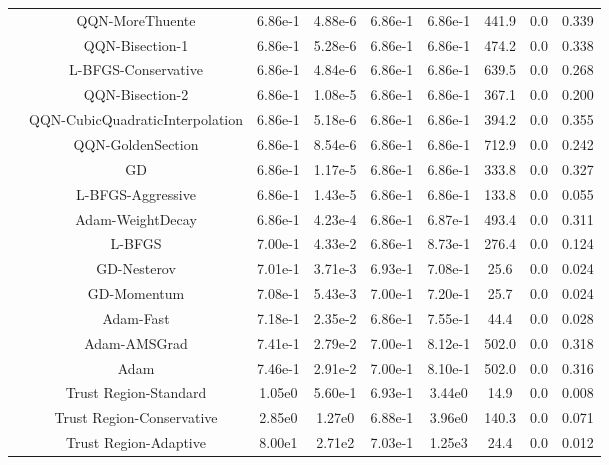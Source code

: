 \documentclass{article}
\begin{document}
{\begin{longtable}{l*{8}{S[table-format=2.2e-1]}}
 & QQN-MoreThuente & 6.86e-1 & 4.88e-6 & 6.86e-1 & 6.86e-1 & 441.9 & 0.0 & 0.339 \\
 & QQN-Bisection-1 & 6.86e-1 & 5.28e-6 & 6.86e-1 & 6.86e-1 & 474.2 & 0.0 & 0.338 \\
 & L-BFGS-Conservative & 6.86e-1 & 4.84e-6 & 6.86e-1 & 6.86e-1 & 639.5 & 0.0 & 0.268 \\
 & QQN-Bisection-2 & 6.86e-1 & 1.08e-5 & 6.86e-1 & 6.86e-1 & 367.1 & 0.0 & 0.200 \\
 & QQN-CubicQuadraticInterpolation & 6.86e-1 & 5.18e-6 & 6.86e-1 & 6.86e-1 & 394.2 & 0.0 & 0.355 \\
 & QQN-GoldenSection & 6.86e-1 & 8.54e-6 & 6.86e-1 & 6.86e-1 & 712.9 & 0.0 & 0.242 \\
 & GD & 6.86e-1 & 1.17e-5 & 6.86e-1 & 6.86e-1 & 333.8 & 0.0 & 0.327 \\
 & L-BFGS-Aggressive & 6.86e-1 & 1.43e-5 & 6.86e-1 & 6.86e-1 & 133.8 & 0.0 & 0.055 \\
 & Adam-WeightDecay & 6.86e-1 & 4.23e-4 & 6.86e-1 & 6.87e-1 & 493.4 & 0.0 & 0.311 \\
 & L-BFGS & 7.00e-1 & 4.33e-2 & 6.86e-1 & 8.73e-1 & 276.4 & 0.0 & 0.124 \\
 & GD-Nesterov & 7.01e-1 & 3.71e-3 & 6.93e-1 & 7.08e-1 & 25.6 & 0.0 & 0.024 \\
 & GD-Momentum & 7.08e-1 & 5.43e-3 & 7.00e-1 & 7.20e-1 & 25.7 & 0.0 & 0.024 \\
 & Adam-Fast & 7.18e-1 & 2.35e-2 & 6.86e-1 & 7.55e-1 & 44.4 & 0.0 & 0.028 \\
 & Adam-AMSGrad & 7.41e-1 & 2.79e-2 & 7.00e-1 & 8.12e-1 & 502.0 & 0.0 & 0.318 \\
 & Adam & 7.46e-1 & 2.91e-2 & 7.00e-1 & 8.10e-1 & 502.0 & 0.0 & 0.316 \\
 & Trust Region-Standard & 1.05e0 & 5.60e-1 & 6.93e-1 & 3.44e0 & 14.9 & 0.0 & 0.008 \\
 & Trust Region-Conservative & 2.85e0 & 1.27e0 & 6.88e-1 & 3.96e0 & 140.3 & 0.0 & 0.071 \\
 & Trust Region-Adaptive & 8.00e1 & 2.71e2 & 7.03e-1 & 1.25e3 & 24.4 & 0.0 & 0.012 \\
\midrule
\end{longtable}
}
\end{document}
